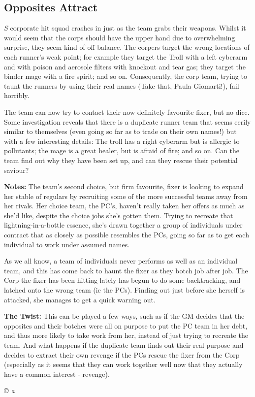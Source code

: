 \documentclass[letterpaper,onecolumn,10pt]{article}
\renewcommand{\textsc}[1]{{\fontspec{Friz Quadrata SC TT}\selectfont #1}}
\newcommand{\getyear}[1]{\StrLeft{#1}{4}}
\newenvironment{scenario}[6]
	{
		\section[#1 {\small\textsc{[#2]}}]{#1} \nopagebreak

		\noindent{\textsc{#2}}\nopagebreak

		\noindent\textit{#3}\nopagebreak
		\def\TMPSCENARIO{{\small\textit{©\getyear{#5}{} #4}}}
	}
	{\TMPSCENARIO}
\newcommand{\sectionlabel}[1]{\textbf{#1: }}
\newcommand{\synopsis}{\sectionlabel{Synopsis}}
\newcommand{\notes}{\sectionlabel{Notes}}
\newcommand{\twist}{\sectionlabel{The Twist}}
\begin{document}
\begin{multicols}{2}
\begin{scenario}{Opposites Attract}
\synopsis Said corporate hit squad crashes in just as the team grabs their weapons. Whilst it would seem that the corps should have the upper hand due to overwhelming surprise, they seem kind of off balance. The corpers target the wrong locations of each runner's weak point; for example they target the Troll with a left cyberarm and with poison and aerosole filters with knockout and tear gas; they target the binder mage with a fire spirit; and so on. Consequently, the corp team, trying to taunt the runners by using their real names (Take that, Paula Giomarti!), fail horribly.

The team can now try to contact their now definitely favourite fixer, but no dice. Some investigation reveals that there is a duplicate runner team that seems eerily similar to themselves (even going so far as to trade on their own names!) but with a few interesting details: The troll has a right cyberarm but is allergic to pollutants; the mage is a great healer, but is afraid of fire; and so on. Can the team find out why they have been set up, and can they rescue their potential saviour?

\notes The team's second choice, but firm favourite, fixer is looking to expand her stable of regulars by recruiting some of the more successful teams away from her rivals. Her choice team, the PC's, haven't really taken her offers as much as she'd like, despite the choice jobs she's gotten them. Trying to recreate that lightning-in-a-bottle essence, she's drawn together a group of individuals under contract that as closely as possible resembles the PCs, going so far as to get each individual to work under assumed names.

As we all know, a team of individuals never performs as well as an individual team, and this has come back to haunt the fixer as they botch job after job. The Corp the fixer has been hitting lately has begun to do some backtracking, and latched onto the wrong team (ie the PCs). Finding out just before she herself is attacked, she manages to get a quick warning out.

\twist This can be played a few ways, such as if the GM decides that the opposites and their botches were all on purpose to put the PC team in her debt, and thus more likely to take work from her, instead of just trying to recreate the team. And what happens if the duplicate team finds out their real purpose and decides to extract their own revenge if the PCs rescue the fixer from the Corp (especially as it seems that they can work together well now that they actually have a common interest - revenge). 


\end{scenario}
\end{multicols}
\end{document}
